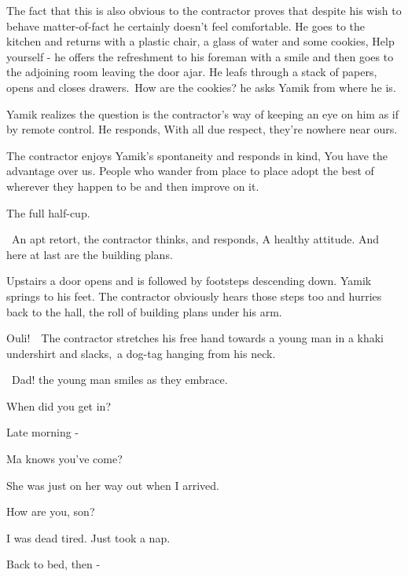 \documentclass[twoside,11pt]{book}
\begin{document}
The fact that this is also obvious to the contractor proves that despite his wish to behave matter-of-fact he certainly
doesn't feel comfortable. He goes to the kitchen and returns with a plastic chair, a glass of water and some cookies,
{\textquotedbl}Help yourself - {\textquotedbl} he offers the refreshment to his foreman with a smile and then goes to
the adjoining room leaving the door ajar. He leafs through a stack of papers, opens and closes
drawers.\ {\textquotedbl}How are the cookies?{\textquotedbl} he asks Yamik from where he is. 

Yamik realizes the question is the contractor's way of keeping an eye on him as if by remote control. He responds,
{\textquotedbl}With all due respect, they're nowhere near ours.{\textquotedbl} 

The contractor enjoys Yamik's spontaneity and responds in kind, {\textquotedbl}You have the advantage over us. People
who wander from place to place adopt the best of wherever they happen to be and then improve on it.{\textquotedbl} 

{\textquotedbl}The full half-cup.{\textquotedbl}

~An apt retort, the contractor thinks, and responds, {\textquotedbl}A healthy attitude. And here at last are the
building plans.{\textquotedbl}

Upstairs a door opens and is followed by footsteps descending down. Yamik springs to his feet. The contractor obviously
hears those steps too and hurries back to the hall, the roll of building plans under his arm. 

{\textquotedbl}Ouli!{\textquotedbl}\ \ The contractor stretches his free hand towards a young man in a khaki undershirt
and slacks,{\ }a dog-tag hanging from his neck.\ 

~{\textquotedbl}Dad!{\textquotedbl} the young man smiles as they embrace. 

{\textquotedbl}When did you get in?{\textquotedbl} 

{\textquotedbl}Late morning -{\textquotedbl} 

{\textquotedbl}Ma knows you've come?{\textquotedbl} 

{\textquotedbl}She was just on her way out when I arrived.{\textquotedbl} 

{\textquotedbl}How are you, son?{\textquotedbl} 

{\textquotedbl}I was dead tired. Just took a nap.{\textquotedbl} 

{\textquotedbl}Back to bed, then -{\textquotedbl} 
\end{document}
